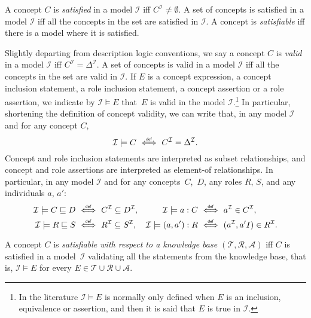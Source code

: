 \documentclass[leqno
,pdflatex
,prodmode
,acmtocl
]{acmsmall}
\makeatletter
\newcommand{\mathcmd}[1]{\ensuremath{#1}\xspace}
\newcommand{\subsumed}{\sqsubseteq}
\newcommand{\metasmbfont}{\mathsf}
\def\@define#1{\mathcmd{\stackrel {\mbox{\tiny\ensuremath{\metasmbfont{def}}}}{{#1}}}}
\def\sm@shdefine#1{\smash[t]{\@define{#1}}}
\newcommand{\defiff}{\mathchoice {\@define{\ \Longleftrightarrow\ }}{\sm@shdefine{\Longleftrightarrow}}{\sm@shdefine{\Leftrightarrow}}{\sm@shdefine{\Leftrightarrow}}}
\newcommand{\indiv}{a}
\newcommand{\I}{\mathcal{I}}
\makeatother
\begin{document}
A concept $C$ is \emph{satisfied} in a model $\I$ iff
$C^\I\neq\emptyset$.
A set of concepts is satisfied in a model $\I$ iff
all the concepts in the set are satisfied in $\I$.
A concept is \emph{satisfiable} iff there is a model where it is satisfied.

Slightly departing from description logic conventions, we say 
a concept $C$ is \emph{valid} in a model $\I$ iff
$C^\I=\Delta^\I$.
A set of concepts is valid in a model $\I$ iff
all the concepts in the set are valid in $\I$.
If $E$ is a concept expression, a concept inclusion statement, a role
inclusion statement, a concept assertion or a role assertion,
we indicate by $\I\models E$ that~$E$ is valid in the model $\I$.\footnote{In the literature $\I\models E$ is
normally only defined when $E$ is an inclusion, equivalence or
assertion, and then it is said that $E$ is true in $\I$.}
In particular, shortening the definition of concept validity, we can write that,
in any model $\I$ and for any concept $C$, 
\[\I\models C\defiff C^\I=\Delta^\I.\]
Concept and role inclusion statements are interpreted as subset relationships, and
concept and role assertions are interpreted as element-of
relationships. In particular, in any model $\I$ and
for any concepts~$C$,~$D$, any roles $R$, $S$, and any individuals $\indiv$, $\indiv'$:
\begin{align*}
\I \models C\subsumed D& \defiff C^\I\subseteq D^\I,&
\I \models \indiv:C& \defiff \indiv^\I\in C^\I,\\
\I \models R\subsumed S& \defiff R^\I\subseteq S^\I,&
\I \models (\indiv,\indiv'):R& \defiff (\indiv^\I,\indiv'^\I)\in R^\I.
\end{align*}

A concept $C$ is \emph{satisfiable with respect to a knowledge base
$(\mathcal{T},\mathcal{R},\mathcal{A})$} iff $C$ is satisfied in a
model~$\I$ validating all the statements from the knowledge base,
that is, $\I\models E$ for every $E\in \mathcal{T}\cup \mathcal{R}\cup
\mathcal{A}$.
\end{document}
